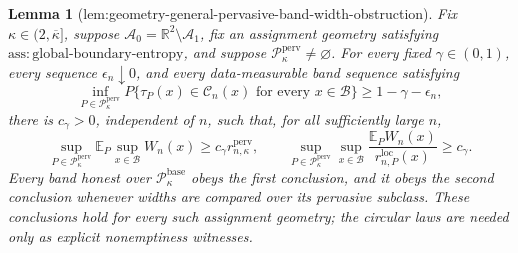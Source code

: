 \documentclass{article}
\newtheorem{lemma}{Lemma}
\begin{document}
\begin{lemma}[lem:geometry-general-pervasive-band-width-obstruction]\label{lem:geometry-general-pervasive-band-width-obstruction}
Fix \(\kappa\in(2,\overline\kappa]\), suppose \(\mathcal A_0=\mathbb R^2\setminus\mathcal A_1\), fix an assignment geometry satisfying \(\mathrm{ass:global\text{-}boundary\text{-}entropy}\), and suppose \(\mathcal P_{\kappa}^{\mathrm{perv}}\ne\varnothing\). For every fixed \(\gamma\in(0,1)\), every sequence \(\epsilon_n\downarrow0\), and every data-measurable band sequence satisfying
\[
 \inf_{P\in\mathcal P_{\kappa}^{\mathrm{perv}}}
 P\{\tau_P(x)\in\mathcal C_n(x)\text{ for every }x\in\mathcal B\}
 \ge1-\gamma-\epsilon_n,
\]
there is \(c_\gamma>0\), independent of \(n\), such that, for all sufficiently large \(n\),
\[
 \sup_{P\in\mathcal P_{\kappa}^{\mathrm{perv}}}
 \mathbb E_P\sup_{x\in\mathcal B}W_n(x)
 \ge c_\gamma r_{n,\kappa}^{\mathrm{perv}},
 \qquad
 \sup_{P\in\mathcal P_{\kappa}^{\mathrm{perv}}}\sup_{x\in\mathcal B}
 \frac{\mathbb E_PW_n(x)}{r_{n,P}^{\mathrm{loc}}(x)}
 \ge c_\gamma.
\]
Every band honest over \(\mathcal P_{\kappa}^{\mathrm{base}}\) obeys the first conclusion, and it obeys the second conclusion whenever widths are compared over its pervasive subclass. These conclusions hold for every such assignment geometry; the circular laws are needed only as explicit nonemptiness witnesses.
\end{lemma}
\end{document}
